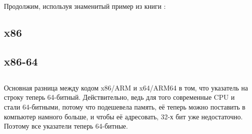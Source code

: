 \section{\HelloWorldSectionName}
\label{sec:helloworld}

Продолжим, используя знаменитый пример из книги \KRBook:



\subsection{x86}





\subsection{x86-64}








\subsection{\Conclusion{}}

Основная разница между кодом x86/ARM и x64/ARM64 в том, что указатель на строку теперь 64-битный.
Действительно, ведь для того современные \ac{CPU} и стали 64-битными, потому что подешевела память,
её теперь можно поставить в компьютер намного больше, и чтобы её адресовать, 32-х бит уже
недостаточно.
Поэтому все указатели теперь 64-битные.



